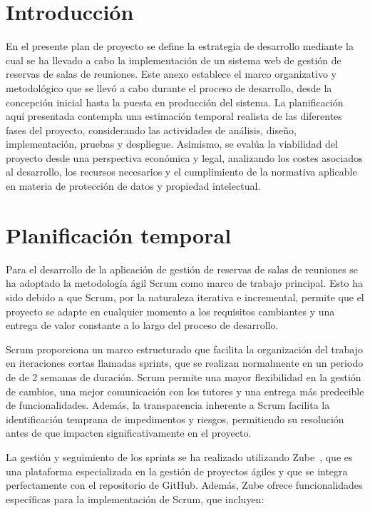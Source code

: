 
\section{Introducción}
En el presente plan de proyecto se define la estrategia de desarrollo mediante la cual se ha llevado a cabo la implementación de un sistema web de gestión de reservas de salas de reuniones. Este anexo establece el marco organizativo y metodológico que se llevó a cabo durante el proceso de desarrollo, desde la concepción inicial hasta la puesta en producción del sistema. La planificación aquí presentada contempla una estimación temporal realista de las diferentes fases del proyecto, considerando las actividades de análisis, diseño, implementación, pruebas y despliegue. Asimismo, se evalúa la viabilidad del proyecto desde una perspectiva económica y legal, analizando los costes asociados al desarrollo, los recursos necesarios y el cumplimiento de la normativa aplicable en materia de protección de datos y propiedad intelectual.

\section{Planificación temporal}
Para el desarrollo de la aplicación de gestión de reservas de salas de reuniones se ha adoptado la metodología ágil Scrum como marco de trabajo principal. Esto ha sido debido a que Scrum, por la naturaleza iterativa e incremental, permite que el proyecto se adapte en cualquier momento a los requisitos cambiantes y una entrega de valor constante a lo largo del proceso de desarrollo.

Scrum proporciona un marco estructurado que facilita la organización del trabajo en iteraciones cortas llamadas sprints, que se realizan normalmente en un periodo de de 2 semanas de duración. Scrum permite una mayor flexibilidad en la gestión de cambios, una mejor comunicación con los tutores y una entrega más predecible de funcionalidades. Además, la transparencia inherente a Scrum facilita la identificación temprana de impedimentos y riesgos, permitiendo su resolución antes de que impacten significativamente en el proyecto.

La gestión y seguimiento de los sprints se ha realizado utilizando Zube~\cite{zube}, que es una plataforma especializada en la gestión de proyectos ágiles y que se integra perfectamente con el repositorio de GitHub. Además, Zube ofrece funcionalidades específicas para la implementación de Scrum, que incluyen:

